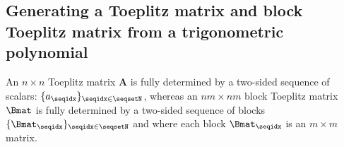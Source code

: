 %
%
%


\subsection{Generating a Toeplitz matrix and block Toeplitz matrix from a trigonometric polynomial}
An $n\times n$ Toeplitz matrix $\mathbf A$ is fully determined by a two-sided sequence of scalars: $\{a_\seqidx\}_{\seqidx \in \seqsetN}$, whereas an $nm\times nm$ block Toeplitz matrix $\Bmat$ is fully determined by a two-sided sequence of blocks $\{\Bmat_\seqidx\}_{\seqidx \in \seqsetN}$ and where each block $\Bmat_\seqidx$ is an $m \times m$ matrix.  

